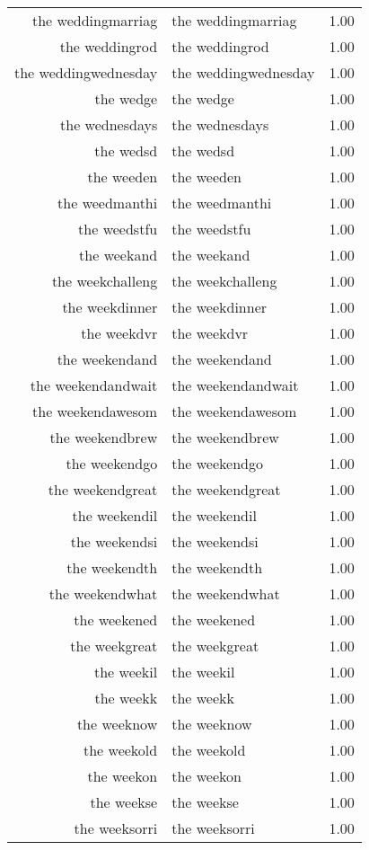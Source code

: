 \begin{table}[ht]
\begin{tabular}{rlr}
  the weddingmarriag & the weddingmarriag & 1.00 \\ 
  the weddingrod & the weddingrod & 1.00 \\ 
  the weddingwednesday & the weddingwednesday & 1.00 \\ 
  the wedge & the wedge & 1.00 \\ 
  the wednesdays & the wednesdays & 1.00 \\ 
  the wedsd & the wedsd & 1.00 \\ 
  the weeden & the weeden & 1.00 \\ 
  the weedmanthi & the weedmanthi & 1.00 \\ 
  the weedstfu & the weedstfu & 1.00 \\ 
  the weekand & the weekand & 1.00 \\ 
  the weekchalleng & the weekchalleng & 1.00 \\ 
  the weekdinner & the weekdinner & 1.00 \\ 
  the weekdvr & the weekdvr & 1.00 \\ 
  the weekendand & the weekendand & 1.00 \\ 
  the weekendandwait & the weekendandwait & 1.00 \\ 
  the weekendawesom & the weekendawesom & 1.00 \\ 
  the weekendbrew & the weekendbrew & 1.00 \\ 
  the weekendgo & the weekendgo & 1.00 \\ 
  the weekendgreat & the weekendgreat & 1.00 \\ 
  the weekendil & the weekendil & 1.00 \\ 
  the weekendsi & the weekendsi & 1.00 \\ 
  the weekendth & the weekendth & 1.00 \\ 
  the weekendwhat & the weekendwhat & 1.00 \\ 
  the weekened & the weekened & 1.00 \\ 
  the weekgreat & the weekgreat & 1.00 \\ 
  the weekil & the weekil & 1.00 \\ 
  the weekk & the weekk & 1.00 \\ 
  the weeknow & the weeknow & 1.00 \\ 
  the weekold & the weekold & 1.00 \\ 
  the weekon & the weekon & 1.00 \\ 
  the weekse & the weekse & 1.00 \\ 
  the weeksorri & the weeksorri & 1.00 \\ 

\end{tabular}
\end{table}
